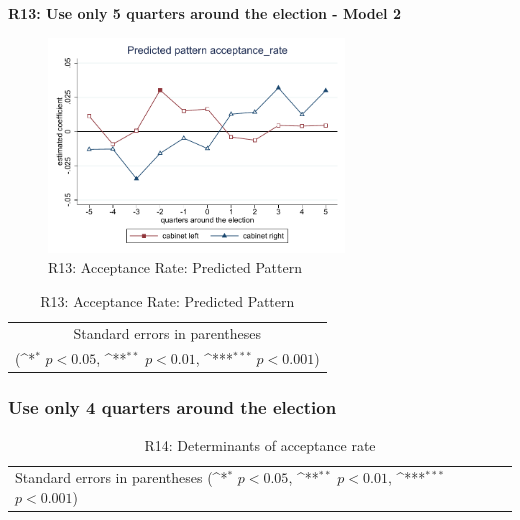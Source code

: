 \documentclass[10pt,a4paper]{scrartcl}
\begin{document}
\clearpage
\textbf{R13: Use only 5 quarters around the election - Model 2}
\begin{figure}[!ht]
	\centering
	\includegraphics[width=0.7\textwidth]{figures_edited/acceptance_rate_graph2_R13.pdf}
	\caption{R13: Acceptance Rate: Predicted Pattern}
\end{figure}

\begin{table}[!ht]\centering
	\footnotesize
	\renewcommand{\arraystretch}{1.2}
	\def\sym#1{\ifmmode^{#1}\else\(^{#1}\)\fi}
	\caption{R13: Acceptance Rate: Predicted Pattern}
	\begin{tabular}{l*{2}{c}}
		\hline\hline
		
		\hline\hline
		\multicolumn{3}{c}{\footnotesize Standard errors in parentheses} \\
		\multicolumn{3}{c}{\footnotesize (\sym{*} \(p<0.05\), \sym{**} \(p<0.01\), \sym{***} \(p<0.001\))} \\
	\end{tabular}
\end{table}





\clearpage
\FloatBarrier
\subsubsection{Use only 4 quarters around the election}
\begin{table}[!ht]\centering
	\renewcommand{\arraystretch}{1.25}
	\small
	\def\sym#1{\ifmmode^{#1}\else\(^{#1}\)\fi}
	\caption{R14: Determinants of acceptance rate}
	\begin{tabular}{l*{3}{c}}
		\hline\hline
		
		\hline\hline
		\multicolumn{4}{l}{\footnotesize Standard errors in parentheses (\sym{*} \(p<0.05\), \sym{**} \(p<0.01\), \sym{***} \(p<0.001\))}\\
	\end{tabular}
\end{table}
\end{document}
